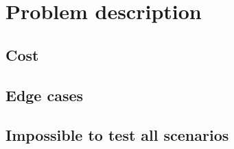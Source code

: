 \chapter{Problem description}

\section{Cost}

\section{Edge cases}

\section{Impossible to test all scenarios}